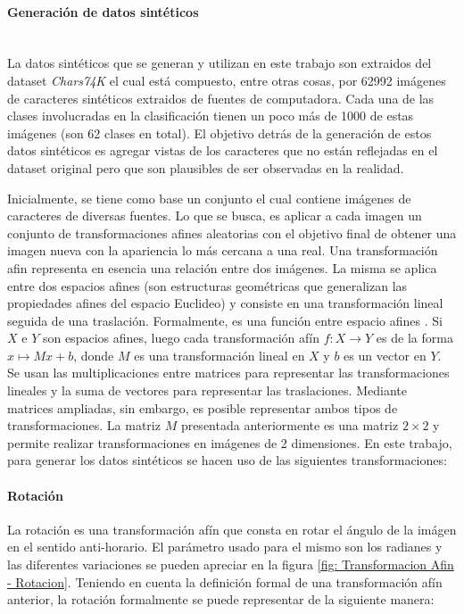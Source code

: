 		\paragraph{Generación de datos sintéticos} ~\\

			La datos sintéticos que se generan y utilizan en este trabajo son extraidos del dataset \textit{Chars74K} el cual está compuesto, entre otras cosas, por 62992 imágenes de caracteres sintéticos extraidos de fuentes de computadora. Cada una de las clases involucradas en la clasificación tienen un poco más de 1000 de estas imágenes (son 62 clases en total). El objetivo detrás de la generación de estos datos sintéticos es agregar vistas de los caracteres que no están reflejadas en el dataset original pero que son plausibles de ser observadas en la realidad.
			
			Inicialmente, se tiene como base un conjunto el cual contiene imágenes de caracteres de diversas fuentes. Lo que se busca, es aplicar a cada imagen un conjunto de transformaciones afines aleatorias con el objetivo final de obtener una imagen nueva con la apariencia  lo más cercana a una real. Una transformación afin representa en esencia una relación entre dos imágenes. La misma se aplica entre dos espacios afines (son estructuras geométricas que generalizan las propiedades afines del espacio Euclideo) y consiste en una transformación lineal seguida de una traslación. Formalmente, es una función entre espacio afines . Si $X$ e $Y$ son espacios afines, luego cada transformación afín $f:X \rightarrow Y$ es de la forma $x\mapsto Mx + b$, donde $M$ es una transformación lineal en $X$ y $b$ es un vector en $Y$. Se usan las multiplicaciones entre matrices para representar las transformaciones lineales y la suma de vectores para representar las traslaciones. Mediante matrices ampliadas, sin embargo, es posible representar ambos tipos de transformaciones.	La matriz $M$ presentada anteriormente es una matriz $2\times 2$ y permite realizar transformaciones en imágenes de 2 dimensiones. En este trabajo, para generar los datos sintéticos se hacen uso de las siguientes transformaciones:
			
			\paragraph{Rotación}
			
				La rotación es una transformación afín que consta en rotar el ángulo de la imágen en el sentido anti-horario. El parámetro usado para el mismo son los radianes y las diferentes variaciones se pueden apreciar en la figura \ref{fig: Transformacion Afin - Rotacion}. Teniendo en cuenta la definición formal de una transformación afín anterior, la rotación formalmente se puede representar de la siguiente manera:

